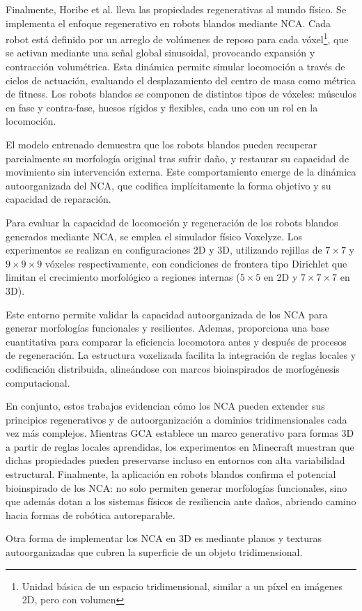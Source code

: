 Finalmente, Horibe et al. \cite{horibe} lleva las propiedades regenerativas al mundo físico. Se implementa el enfoque regenerativo en robots blandos mediante NCA. Cada robot está definido por un arreglo de volúmenes de reposo para cada vóxel\footnote{Unidad básica de un espacio tridimensional, similar a un píxel en imágenes 2D, pero con volumen}, que se activan mediante una señal global sinusoidal, provocando expansión y contracción volumétrica. Esta dinámica permite simular locomoción a través de ciclos de actuación, evaluando el desplazamiento del centro de masa como métrica de fitness. Los robots blandos se componen de distintos tipos de vóxeles: músculos en fase y contra-fase, huesos rígidos y flexibles, cada uno con un rol en la locomoción.

El modelo entrenado demuestra que los robots blandos pueden recuperar parcialmente su morfología original tras sufrir daño, y restaurar su capacidad de movimiento sin intervención externa. Este comportamiento emerge de la dinámica autoorganizada del NCA, que codifica implícitamente la forma objetivo y su capacidad de reparación.

Para evaluar la capacidad de locomoción y regeneración de los robots blandos generados mediante NCA, se emplea el simulador físico Voxelyze. Los experimentos se realizan en configuraciones 2D y 3D, utilizando rejillas de $7 \times 7$ y $9 \times 9 \times 9$ vóxeles respectivamente, con condiciones de frontera tipo Dirichlet que limitan el crecimiento morfológico a regiones internas ($5 \times 5$ en 2D y $7 \times 7 \times 7$ en 3D).

Este entorno permite validar la capacidad autoorganizada de los NCA para generar morfologías funcionales y resilientes. Ademas, proporciona una base cuantitativa para comparar la eficiencia locomotora antes y después de procesos de regeneración. La estructura voxelizada facilita la integración de reglas locales y codificación distribuida, alineándose con marcos bioinspirados de morfogénesis computacional.

En conjunto, estos trabajos evidencian cómo los NCA pueden extender sus principios regenerativos y de autoorganización a dominios tridimensionales cada vez más complejos. Mientras GCA establece un marco generativo para formas 3D a partir de reglas locales aprendidas, los experimentos en Minecraft muestran que dichas propiedades pueden preservarse incluso en entornos con alta variabilidad estructural. Finalmente, la aplicación en robots blandos confirma el potencial bioinspirado de los NCA: no solo permiten generar morfologías funcionales, sino que además dotan a los sistemas físicos de resiliencia ante daños, abriendo camino hacia formas de robótica autoreparable.

Otra forma de implementar los NCA en 3D es mediante planos y texturas autoorganizadas que cubren la superficie de un objeto tridimensional. 